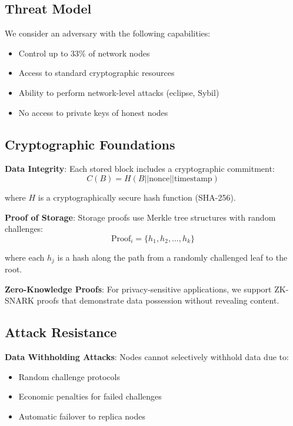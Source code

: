 \documentclass[11pt,a4paper]{article}
\begin{document}
\subsection{Threat Model}

We consider an adversary with the following capabilities:
\begin{itemize}
\item Control up to 33\% of network nodes
\item Access to standard cryptographic resources
\item Ability to perform network-level attacks (eclipse, Sybil)
\item No access to private keys of honest nodes
\end{itemize}

\subsection{Cryptographic Foundations}

\textbf{Data Integrity}: Each stored block includes a cryptographic commitment:
\begin{equation}
C(B) = H(B || \text{nonce} || \text{timestamp})
\end{equation}

where $H$ is a cryptographically secure hash function (SHA-256).

\textbf{Proof of Storage}: Storage proofs use Merkle tree structures with random challenges:
\begin{equation}
\text{Proof}_i = \{h_1, h_2, \ldots, h_k\}
\end{equation}

where each $h_j$ is a hash along the path from a randomly challenged leaf to the root.

\textbf{Zero-Knowledge Proofs}: For privacy-sensitive applications, we support ZK-SNARK proofs that demonstrate data possession without revealing content.

\subsection{Attack Resistance}

\textbf{Data Withholding Attacks}: Nodes cannot selectively withhold data due to:
\begin{itemize}
\item Random challenge protocols
\item Economic penalties for failed challenges
\item Automatic failover to replica nodes
\end{itemize}
\end{document}
